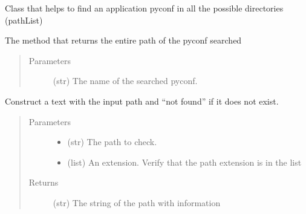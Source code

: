 \documentclass[a4paper,10pt,english]{sphinxmanual}
\begin{document}
\begin{fulllineitems}
\label{\detokenize{apidoc_src/src:src.configManager.ConfigOpener}}
Class that helps to find an application pyconf 
in all the possible directories (pathList)

\begin{fulllineitems}
\label{\detokenize{apidoc_src/src:src.configManager.ConfigOpener.get_path}}
The method that returns the entire path of the pyconf searched
\begin{quote}\begin{description}
\item[{Parameters}] \leavevmode
{} \textendash{} (str) The name of the searched pyconf.

\end{description}\end{quote}

\end{fulllineitems}


\end{fulllineitems}


\begin{fulllineitems}
\label{\detokenize{apidoc_src/src:src.configManager.check_path}}
Construct a text with the input path and “not found” if it does not exist.
\begin{quote}\begin{description}
\item[{Parameters}] \leavevmode\begin{itemize}
\item {} 
 \textendash{} (str) The path to check.

\item {} 
 \textendash{} (list) 
An extension. Verify that the path extension is in the list

\end{itemize}

\item[{Returns}] \leavevmode
(str) The string of the path with information

\end{description}\end{quote}

\end{fulllineitems}
\end{document}
